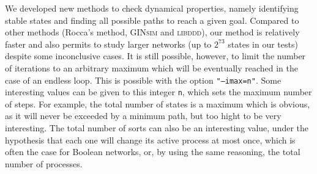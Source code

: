 We developed new methods to check dynamical properties,
namely identifying stable states and finding all possible paths to reach a given goal.
Compared to other methods (Rocca's method, \textsc{GINsim} and \textsc{libddd}),
our method is relatively faster and also permits to study larger networks
(up to $2^{73}$ states in our tests) despite some inconclusive cases.
%
It is still possible, however, to limit the number of iterations to an arbitrary
maximum which will be eventually reached in the case of an endless loop. This is possible with the option \texttt{"--imax=n"}.
 
Some interesting values can be given to this integer \texttt{n},
which sets the maximum number of steps.
For example, the total number of states is a maximum which is obvious,
as it will never be exceeded by a minimum path,
but too hight to be very interesting.
The total number of sorts can also be an interesting value,
under the hypothesis that each one will change its active process at most once,
which is often the case for Boolean networks,
or, by using the same reasoning, the total number of processes.
%
